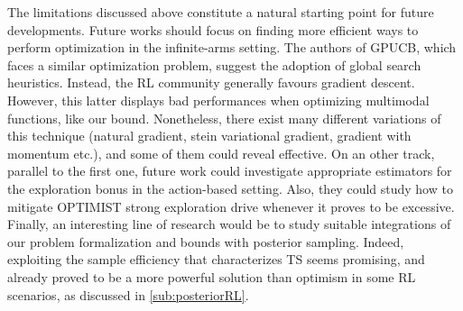 The limitations discussed above constitute a natural starting point for future developments.
Future works should focus on finding more efficient ways to perform optimization in
the infinite-arms setting. The authors of \gls{GPUCB}, which faces a similar optimization problem, suggest the adoption of global search heuristics. Instead, the \gls{RL} community generally favours gradient descent. However, this latter displays bad performances when optimizing multimodal functions, like our bound. Nonetheless, there exist many different variations of this technique (natural gradient, stein variational gradient, gradient with momentum etc.), and some of them could reveal effective.
On an other track, parallel to the first one, future work could investigate appropriate estimators for the exploration bonus in the action-based setting. Also, they could study how to mitigate \gls{OPTIMIST} strong exploration drive whenever it proves to be excessive.
Finally, an interesting line of research would be to study suitable integrations of our problem formalization and bounds with posterior sampling. Indeed, exploiting the sample efficiency that characterizes \gls{TS} seems promising, and already proved to be a more powerful solution than optimism in some \gls{RL} scenarios, as discussed in \ref{sub:posteriorRL}. 